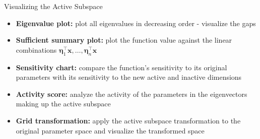 \documentclass[10pt]{beamer}
\begin{document}
\begin{frame}{Visualizing the Active Subspace}
\begin{itemize}\itemsep20pt
    \item \textbf{Eigenvalue plot:} plot all eigenvalues in decreasing order - visualize the gaps
    
    \item \textbf{Sufficient summary plot:} plot the function value against the linear combinations $\bm{\eta}_1^\top \bm{x}, \dots, \bm{\eta}_n^\top \bm{x}$
    
    \item \textbf{Sensitivity chart:} compare the function's sensitivity to its original parameters with its sensitivity to the new active and inactive dimensions 
    
    \item \textbf{Activity score:} analyze the activity of the parameters in the eigenvectors making up the active subspace
    
    \item \textbf{Grid transformation:} apply the active subspace transformation to the original parameter space and visualize the transformed space
\end{itemize}
\end{frame}
\end{document}
